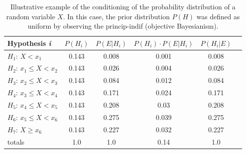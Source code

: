 \documentclass[./main_en.tex]{subfiles}
\begin{document}
\begin{table}[t]
    \centering	
    \small
    \sffamily
    \begin{tabular}{ l c c c c c } %
        \toprule
        \textbf{Hypothesis \textit{i}} & \textbf{$P(H_i)$} & \textbf{$P(E | H_i)$} & \textbf{$P(H_i) \cdot P(E | H_i)$} & \textbf{$P(H_i | E)$}\\ 
        \midrule
        $H_1$: $X < x_1$ & 0.143 & 0.008 & 0.001 & 0.008\\ 
        $H_2$: $x_1 \leq X < x_2$ & 0.143 & 0.026 & 0.004 & 0.026\\ 
        $H_3$: $x_2 \leq X < x_3$ & 0.143 & 0.084 & 0.012 & 0.084\\ 
        $H_4$: $x_3 \leq X < x_4$ & 0.143 & 0.171 & 0.024 & 0.171\\ 
        $H_5$: $x_4 \leq X < x_5$ & 0.143 & 0.208 & 0.03 & 0.208\\ 
        $H_6$: $x_5 \leq X < x_6$ & 0.143 & 0.275 & 0.039 & 0.275\\ 
        $H_7$: $X \geq x_6$ & 0.143 & 0.227 & 0.032 & 0.227\\ 
        \midrule
        totals & 1.0 & 1.0 & 0.14 & 1.0\\
        \bottomrule
    \end{tabular}
    \caption[Objective \gls{conditioning} example]{
    Illustrative example of the \gls{conditioning} of the probability distribution of a random variable $X$. In this case, the prior distribution $P(H)$ was defined as uniform by observing the \gls{princip-indif} (objective Bayesianism).
    }
    \label{tbl:objective}
\end{table} 
\end{document}
